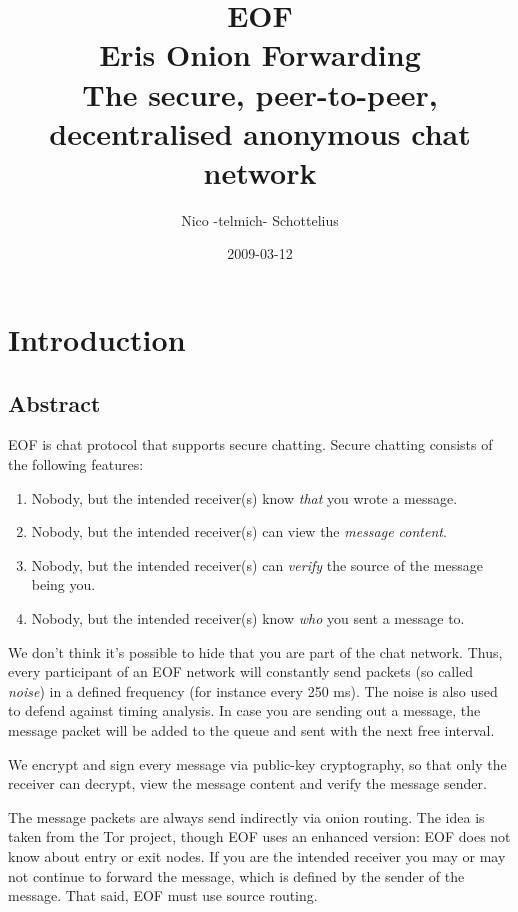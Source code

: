 \documentclass[12pt,a4paper]{book}
\begin{document}
\title{EOF\\Eris Onion Forwarding\\
The secure, peer-to-peer, decentralised anonymous chat network}
\date{2009-03-12}
\author{Nico -telmich- Schottelius}

\maketitle
\tableofcontents
\newpage

\chapter{Introduction}
\section{Abstract}
EOF is chat protocol that supports secure chatting.
Secure chatting consists of the following features:
\begin{enumerate}
\item Nobody, but the intended receiver(s) know \emph{that} you wrote a message.
\item Nobody, but the intended receiver(s) can view the \emph{message content}.
\item Nobody, but the intended receiver(s) can \emph{verify} the source of the message being you.
\item Nobody, but the intended receiver(s) know \emph{who} you sent a message to.
\end{enumerate}
We don't think it's possible to hide that you are part of the chat network.
Thus, every participant of an EOF network will constantly send packets
(so called \emph{noise}) in a defined frequency (for instance every 250 ms).
The noise is also used to defend against timing analysis.
In case you are sending out a message, the message packet will be added to the
queue and sent with the next free interval.

We encrypt and sign every message via public-key cryptography\cite{pgp-1},
so that only the receiver can decrypt, view the message content and verify
the message sender.

The message packets are always send indirectly via onion routing\cite{onion-1}.
The idea is taken from the Tor project\cite{tor-1}, though EOF uses an enhanced
version: EOF does not know about entry or exit nodes. If you are the intended
receiver you may or may not continue to forward the message, which is defined
by the sender of the message. That said, EOF must use source
routing\cite{source-routing-1}.
\end{document}
